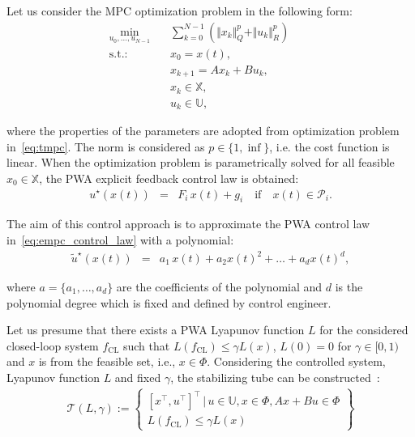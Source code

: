 \documentclass[letterpaper, 10 pt, conference]{ieeeconf}
\begin{document}
Let us consider the MPC optimization problem in the following form:
\begin{subequations}
	\label{eq:empc}
	\begin{eqnarray}
		\label{eq:empc_cost}
		\min_{u_{0},\ldots,u_{N-1}} \!\!\!\!\!\!\!\!\!\!\! &\,& \sum_{k=0}^{N-1} \left( \Vert x_{k} \Vert_{Q}^{p} + \Vert u_{k} \Vert_{R}^{p} \right) \qquad \\
		\label{eq:empc_rpi}
		\mathrm{s.t.\!:} &\,& x_0 = x(t), \\
		\label{eq:empc_model}
		&\,&  x_{k+1} = A x_{k} + B u_{k} , \\
		\label{eq:empc_constraints_state}
		&\,& x_{k} \in \mathbb{X} , \\
		\label{eq:empc_constraints_input}
		&\,& u_{k} \in \mathbb{U},
	\end{eqnarray}
\end{subequations}

where the properties of the parameters are adopted from optimization problem in~\eqref{eq:tmpc}. The norm is considered as $p \in \{1,\inf\}$, i.e. the cost function is linear. When the optimization problem is parametrically solved for all feasible $x_0 \in \mathbb{X}$, the PWA explicit feedback control law is obtained:
\begin{eqnarray}
	\label{eq:empc_control_law}
	u^{\star}(x(t)) \!\!\!\!&=&\!\!\!\! F_{i} \, x(t) + g_{i} \quad \text{if} \quad x(t) \in \mathcal{P}_{i}.
\end{eqnarray}

The aim of this control approach is to approximate the PWA control law in~\eqref{eq:empc_control_law} with a polynomial:
\begin{eqnarray}
	\label{eq:poly_control_law}
	\widetilde{u}^{\star}(x(t)) \!\!\!\!&=&\!\!\!\! a_{1} \, x(t) + a_{2} x(t)^2 + \dots + a_{d} x(t)^d,
\end{eqnarray}

where $a =\{a_{1}, \dots, a_{d}\}$ are the coefficients of the polynomial and $d$ is the polynomial degree which is fixed and defined by control engineer.

Let us presume that there exists a PWA Lyapunov function $L$ for the considered closed-loop system $f_{\mathrm{CL}}$ such that $L(f_{\mathrm{CL}}) \le \gamma L(x)$, $L(0) = 0$ for $\gamma \in [0,1)$ and $x$ is from the feasible set, i.e., $x \in \Phi$. Considering the controlled system, Lyapunov function $L$ and fixed $\gamma$, the stabilizing tube can be constructed~\cite{tube_FCh}:
\begin{eqnarray}
	\label{eq:stab_tube}
	\mathcal{T}(L, \gamma) := \begin{Bmatrix}
		[x^\top, u^\top]^\top \,|\, u \in \mathbb{U}, x \in \Phi, Ax+Bu \in \Phi \\
		L(f_{\mathrm{CL}}) \le \gamma L(x)		
	\end{Bmatrix} 
\end{eqnarray}
\end{document}
